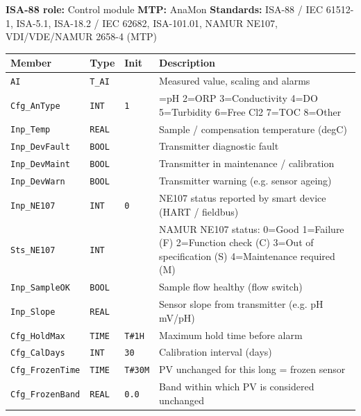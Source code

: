{\small\textbf{ISA-88 role:} Control module \quad \textbf{MTP:} AnaMon \quad \textbf{Standards:} ISA-88 /\allowbreak{} IEC 61512-1, ISA-5.1, ISA-18.2 /\allowbreak{} IEC 62682, ISA-101.01, NAMUR NE107, VDI/\allowbreak{}VDE/\allowbreak{}NAMUR 2658-4 (MTP)}
{\footnotesize
\begin{longtable}{@{}>{\raggedright\arraybackslash}p{3.4cm}>{\raggedright\arraybackslash}p{3.3cm}>{\raggedright\arraybackslash}p{1.3cm}>{\raggedright\arraybackslash}p{6.4cm}@{}}
\toprule
\rowcolor{tblhead}\textbf{Member} & \textbf{Type} & \textbf{Init} & \textbf{Description} \\
\midrule
\endhead
\texttt{AI} & \texttt{T\_AI} &  & Measured value, scaling and alarms \\
\texttt{Cfg\_AnType} & \texttt{INT} & \texttt{1} & 1=pH 2=ORP 3=Conductivity 4=DO 5=Turbidity 6=Free Cl2 7=TOC 8=Other \\
\texttt{Inp\_Temp} & \texttt{REAL} &  & Sample /\allowbreak{} compensation temperature (degC) \\
\texttt{Inp\_DevFault} & \texttt{BOOL} &  & Transmitter diagnostic fault \\
\texttt{Inp\_DevMaint} & \texttt{BOOL} &  & Transmitter in maintenance /\allowbreak{} calibration \\
\texttt{Inp\_DevWarn} & \texttt{BOOL} &  & Transmitter warning (e.g. sensor ageing) \\
\texttt{Inp\_NE107} & \texttt{INT} & \texttt{0} & NE107 status reported by smart device (HART /\allowbreak{} fieldbus) \\
\texttt{Sts\_NE107} & \texttt{INT} &  & NAMUR NE107 status: 0=Good 1=Failure (F) 2=Function check (C) 3=Out of specification (S) 4=Maintenance required (M) \\
\texttt{Inp\_SampleOK} & \texttt{BOOL} &  & Sample flow healthy (flow switch) \\
\texttt{Inp\_Slope} & \texttt{REAL} &  & Sensor slope from transmitter (e.g. pH mV/\allowbreak{}pH) \\
\texttt{Cfg\_HoldMax} & \texttt{TIME} & \texttt{T\#1H} & Maximum hold time before alarm \\
\texttt{Cfg\_CalDays} & \texttt{INT} & \texttt{30} & Calibration interval (days) \\
\texttt{Cfg\_FrozenTime} & \texttt{TIME} & \texttt{T\#30M} & PV unchanged for this long = frozen sensor \\
\texttt{Cfg\_FrozenBand} & \texttt{REAL} & \texttt{0.0} & Band within which PV is considered unchanged \\

\end{longtable}}
